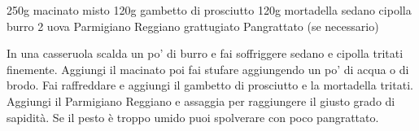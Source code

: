 \begin{ingreds}
	250g macinato misto
	120g gambetto di prosciutto
	120g mortadella
	sedano
	cipolla
	burro
	2 uova
	Parmigiano Reggiano grattugiato
	Pangrattato (se necessario)

\end{ingreds}

\begin{method}
In una casseruola scalda un po' di burro e fai soffriggere sedano e cipolla tritati finemente. Aggiungi il macinato poi fai stufare aggiungendo un po' di acqua o di brodo. Fai raffreddare e aggiungi il gambetto di prosciutto e la mortadella tritati. Aggiungi il Parmigiano Reggiano e assaggia per raggiungere il giusto grado di sapidità. Se il pesto è troppo umido puoi spolverare con poco pangrattato.


\end{method}




